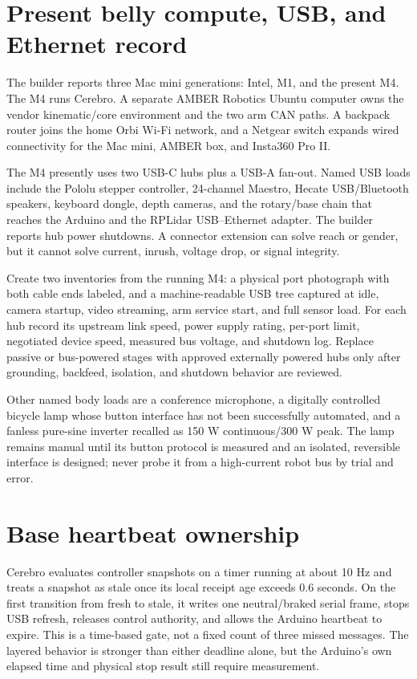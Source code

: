 \documentclass[10pt,openany]{book}
\begin{document}
\section{Present belly compute, USB, and Ethernet record}

The builder reports three Mac mini generations: Intel, M1, and the present M4. The M4 runs Cerebro. A separate AMBER Robotics Ubuntu computer owns the vendor kinematic/core environment and the two arm CAN paths. A backpack router joins the home Orbi Wi-Fi network, and a Netgear switch expands wired connectivity for the Mac mini, AMBER box, and Insta360 Pro II.

The M4 presently uses two USB-C hubs plus a USB-A fan-out. Named USB loads include the Pololu stepper controller, 24-channel Maestro, Hecate USB/Bluetooth speakers, keyboard dongle, depth cameras, and the rotary/base chain that reaches the Arduino and the RPLidar USB--Ethernet adapter. The builder reports hub power shutdowns. A connector extension can solve reach or gender, but it cannot solve current, inrush, voltage drop, or signal integrity.

\ROBUSBNETDiagram

Create two inventories from the running M4: a physical port photograph with both cable ends labeled, and a machine-readable USB tree captured at idle, camera startup, video streaming, arm service start, and full sensor load. For each hub record its upstream link speed, power supply rating, per-port limit, negotiated device speed, measured bus voltage, and shutdown log. Replace passive or bus-powered stages with approved externally powered hubs only after grounding, backfeed, isolation, and shutdown behavior are reviewed.

Other named body loads are a conference microphone, a digitally controlled bicycle lamp whose button interface has not been successfully automated, and a fanless pure-sine inverter recalled as 150 W continuous/300 W peak. The lamp remains manual until its button protocol is measured and an isolated, reversible interface is designed; never probe it from a high-current robot bus by trial and error.

\section{Base heartbeat ownership}

Cerebro evaluates controller snapshots on a timer running at about 10 Hz and treats a snapshot as stale once its local receipt age exceeds 0.6 seconds. On the first transition from fresh to stale, it writes one neutral/braked serial frame, stops USB refresh, releases control authority, and allows the Arduino heartbeat to expire. This is a time-based gate, not a fixed count of three missed messages. The layered behavior is stronger than either deadline alone, but the Arduino's own elapsed time and physical stop result still require measurement.
\end{document}
